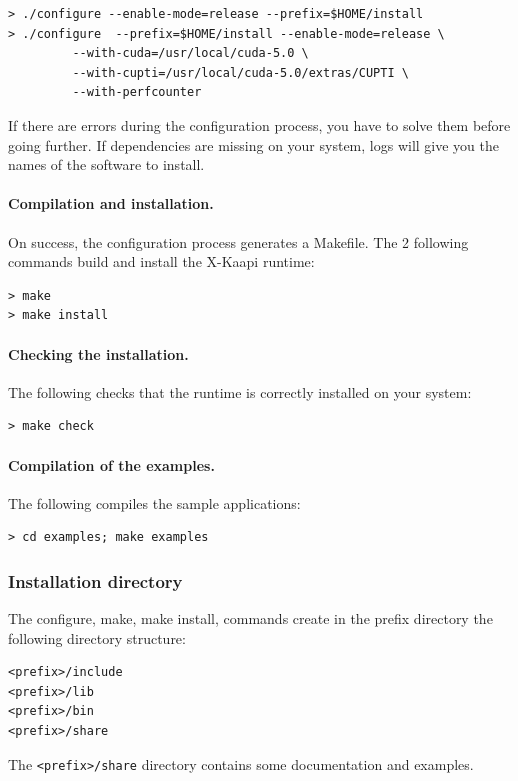 \documentclass{article}[12pt]
\newcommand{\kaapi}{\textsc{X}-Kaapi\xspace}
\begin{document}
\begin{verbatim}
> ./configure --enable-mode=release --prefix=$HOME/install
> ./configure  --prefix=$HOME/install --enable-mode=release \
         --with-cuda=/usr/local/cuda-5.0 \
         --with-cupti=/usr/local/cuda-5.0/extras/CUPTI \
         --with-perfcounter 
\end{verbatim}
If there are errors during the configuration process, you have to solve
them before going further. If dependencies are missing on your
system, logs will give you the names of the software to install.

\paragraph{Compilation and installation.}
On success, the configuration process generates a Makefile. The 2 following
commands build and install the \kaapi runtime:
\begin{verbatim}
> make
> make install
\end{verbatim}

\paragraph{Checking the installation.}
The following checks that the runtime is correctly installed on your system:
\begin{verbatim}
> make check
\end{verbatim}

\paragraph{Compilation of the examples.}
The following compiles the sample applications:
\begin{verbatim}
> cd examples; make examples
\end{verbatim}

\subsubsection*{Installation directory}

The configure, make, make install, commands create in the prefix directory the following 
directory structure:
\begin{verbatim}
<prefix>/include
<prefix>/lib
<prefix>/bin
<prefix>/share
\end{verbatim}

The \texttt{<prefix>/share} directory contains some documentation and examples.
\end{document}
